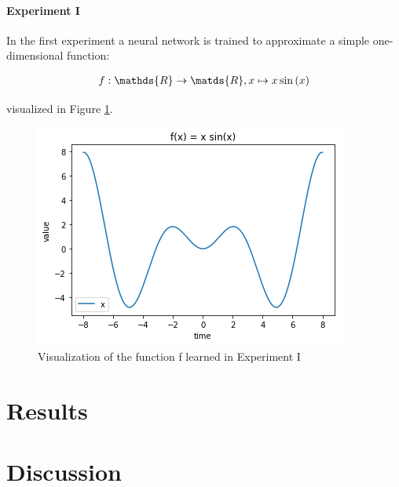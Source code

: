 \documentclass[10pt,a4paper,twocolumn]{article}
\begin{document}
\paragraph{Experiment I} In the first experiment a neural network is trained to approximate a simple one-dimensional function:

\begin{align}
f: \mathds{R} \to \matds{R}, x \mapsto x\sin{(x)}
\end{align}

visualized in Figure \ref{fig:exp1_func}.

\begin{figure}
\centering
\includegraphics[]{function.png}
\caption{Visualization of the function f learned in Experiment I}\label{fig:exp1_func}
\end{figure}
\section{Results}

\section{Discussion}


\end{document}
